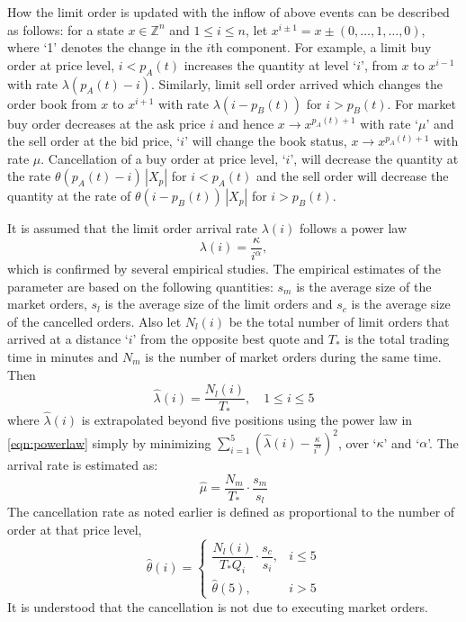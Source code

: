 How the limit order is updated with the inflow of above events can be described as follows: for a state $x \in \mathbb{Z}^n$ and $1 \leq i \leq n$, let $x^{i \pm 1}= x \pm (0,\ldots,1,\ldots,0)$, where `1' denotes the change in the $i$th component. For example, a limit buy order at price level, $i < p_A(t)$ increases the quantity at level `$i$', from $x$ to $x^{i-1}$ with rate $\lambda(p_A(t) - i)$. Similarly, limit sell order arrived which changes the order book from $x$ to $x^{i+1}$ with rate $\lambda(i - p_B(t))$ for $i > p_B(t)$. For market buy order decreases at the ask price $i$ and hence $x \to x^{p_A(t)+1}$ with rate `$\mu$' and the sell order at the bid price, `$i$' will change the book status, $x \to x^{p_A(t)+1}$ with rate $\mu$. Cancellation of a buy order at price level, `$i$', will decrease the quantity at the rate $\theta\left(p_A(t) - i \right) \,|X_p|$ for $i < p_A(t)$ and the sell order will decrease the quantity at the rate of $\theta\left(i - p_B(t)\right)\, |X_p|$ for $i > p_B(t)$.


It is assumed that the limit order arrival rate $\lambda(i)$ follows a power law
	\begin{equation} \label{eqn:powerlaw}
	\lambda(i)=\dfrac{\kappa}{i^\alpha},
	\end{equation}
which is confirmed by several empirical studies. The empirical estimates of the parameter are based on the following quantities: $s_m$ is the average size of the market orders, $s_l$ is the average size of the limit orders and $s_c$ is the average size of the cancelled orders. Also let $N_l(i)$ be the total number of limit orders that arrived at a distance `$i$' from the opposite best quote and $T_*$ is the total trading time in minutes and $N_m$ is the number of market orders during the same time. Then 
	\begin{equation} \label{eqn:hatlambdant}
	\hat{\lambda}(i)= \dfrac{N_l(i)}{T_*}, \quad 1 \leq i \leq 5
	\end{equation}
where $\hat{\lambda}(i)$ is extrapolated beyond five positions using the power law in \eqref{eqn:powerlaw} simply by minimizing $\sum_{i=1}^5 (\hat{\lambda}(i) - \frac{\kappa}{i^\alpha})^2$, over `$\kappa$' and `$\alpha$'. The arrival rate is estimated as:
	\begin{equation} \label{eqn:hatnmt}
	\hat{\mu}=\dfrac{N_m}{T_*} \cdot \dfrac{s_m}{s_l}
	\end{equation}
The cancellation rate as noted earlier is defined as proportional to the number of order at that price level,
	\begin{equation} \label{eqn:hatthetacase}
	\hat{\theta}(i)=
	\begin{cases}
	\dfrac{N_l(i)}{T_*Q_i} \cdot \dfrac{s_c}{s_i}, & i \leq 5 \\
	\hat{\theta}(5), & i>5
	\end{cases}
	\end{equation}
It is understood that the cancellation is not due to executing market orders.


